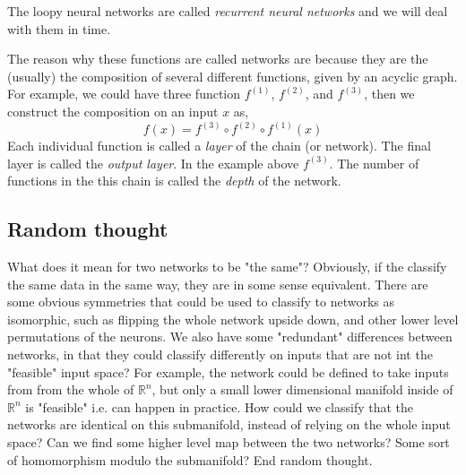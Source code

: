\documentclass[10pt,a4paper]{article}
\begin{document}
The loopy neural networks are called \textit{recurrent neural networks} and we will deal with them in time.

The reason why these functions are called networks are because they are the (usually) the composition of several different functions, given by an acyclic graph. For example, we could have three function $f^{(1)}$, $f^{(2)}$, and  $f^{(3)}$, then we construct the composition on an input $x$ as,
$$
f(x) = f^{(3)} \circ f^{(2)} \circ f^{(1)} (x)
$$
Each individual function is called a \textit{layer} of the chain (or network). The final layer is called the \textit{output layer}. In the example above $f^{(3)}$. The number of functions in the this chain is called the \textit{depth} of the network. 

\subsection*{Random thought}
What does it mean for two networks to be "the same"? Obviously, if the classify the same data in the same way, they are in some sense equivalent. There are some obvious symmetries that could be used to classify to networks as isomorphic, such as flipping the whole network upside down, and other lower level permutations of the neurons. We also have some "redundant" differences between networks, in that they could classify differently on inputs that are not int the "feasible" input space? For example, the network could be defined to take inputs from from the whole of $\mathbb{R}^n$, but only a small lower dimensional manifold inside of $\mathbb{R}^n$ is "feasible" i.e. can happen in practice. How could we classify that the networks are identical on this submanifold, instead of relying on the whole input space? Can we find some higher level map between the two networks? Some sort of homomorphism modulo the submanifold?
End random thought.
\end{document}
